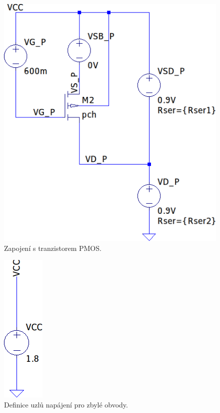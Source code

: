 \documentclass{protokol}
\begin{document}
  \begin{figure}[h!]
    \centering
    \includegraphics[scale=1]{img/pmos.png}
    \caption{Zapojení s tranzistorem PMOS.}
    \label{fig:img-pmos-png}
  \end{figure}

  \begin{figure}[h!]
    \centering
    \includegraphics[scale=1]{img/power.png}
    \caption{Definice uzlů napájení pro zbylé obvody.}
    \label{fig:img-power-png}
  \end{figure}
\end{document}
